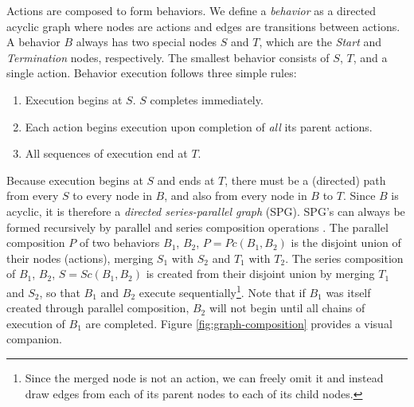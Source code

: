\documentclass[conference]{IEEEtran}
\theoremstyle{definition}
\begin{document}
Actions are composed to form behaviors. We define a \textit{behavior} as a directed acyclic graph where nodes are
actions and edges are transitions between actions.  A behavior \(B\) always has
two special nodes \(S\) and \(T\), which are the \textit{Start} and
\textit{Termination} nodes, respectively.  The smallest behavior consists of
\(S\), \(T\), and a single action.  Behavior execution follows three simple
rules:

\begin{enumerate}
\item Execution begins at \(S\).  \(S\) completes immediately.
\item Each action begins execution upon completion of \textit{all} its parent actions.
\item All sequences of execution end at \(T\).
\end{enumerate}

Because execution begins at \(S\) and ends at \(T\), there must be a (directed)
path from every \(S\) to every node in \(B\), and also from every node in \(B\)
to \(T\). Since \(B\) is acyclic, it is therefore a \textit{directed series-parallel graph} (SPG).
SPG's can always be formed recursively by parallel and series composition
operations \cite{valdes1979recognition}. The parallel composition \(P\) of two behaviors \(B_1\),
\(B_2\), \(P = Pc(B_1, B_2)\) is the disjoint union of their nodes (actions),
merging \(S_1\) with \(S_2\) and \(T_1\) with \(T_2\). The series composition
of \(B_1\), \(B_2\), \(S = Sc(B_1, B_2)\) is created from their disjoint union
by merging \(T_1\) and \(S_2\), so that \(B_1\) and \(B_2\) execute
sequentially\footnote{Since the merged node is not an action, we can freely
omit it and instead draw edges from each of its parent nodes to each of its
child nodes.}.  Note that if \(B_1\) was itself created through parallel
composition, \(B_2\) will not begin until all chains of execution of \(B_1\)
are completed. Figure \ref{fig:graph-composition} provides a visual companion.
\end{document}
